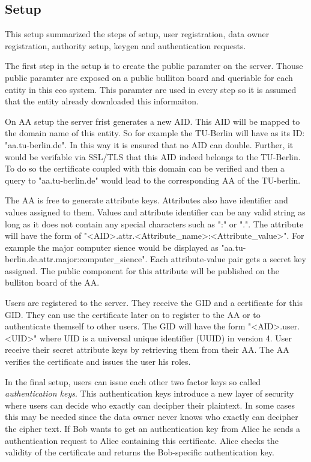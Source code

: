 \subsection{Setup}
This setup summarized the steps of \cite{li2017two} setup, user registration, data owner registration, authority setup, keygen and authentication requests. 

The first step in the setup is to create the public paramter on the server. Thouse public paramter are exposed on a public bulliton board and queriable for each entity in this eco system. This paramter are used in every step so it is assumed that the entity already downloaded this informaiton. 

On AA setup the server frist generates a new AID. This AID will be mapped to the domain name of this entity. So for example the TU-Berlin will have as its ID: "aa.tu-berlin.de". In this way it is ensured that no AID can double. Further, it would be verifable via SSL/TLS that this AID indeed belongs to the TU-Berlin. To do so the certificate coupled with this domain can be verified and then a query to "aa.tu-berlin.de" would lead to the corresponding AA of the TU-berlin.

The AA is free to generate attribute keys. Attributes also have identifier and values assigned to them. Values and attribute identifier can be any valid string as long as it does not contain any special characters such as ":" or ".". The attribute will have the form of "<AID>.attr.<Attribute_name>:<Attribute_value>". For example the major computer sience would be displayed as "aa.tu-berlin.de.attr.major:computer_sience". Each attribute-value pair gets a secret key assigned. The public component for this attribute will be published on the bulliton board of the AA. 

Users are registered to the server. They receive the GID and a certificate for this GID. They can use the certificate later on to register to the AA or to authenticate themself to other users. The GID will have the form "<AID>.user.<UID>" where UID is a universal unique identifier (\ac{UUID}) in version 4.  
User receive their secret attribute keys by retrieving them from their AA. The AA verifies the certificate and issues the user his roles.

In the final setup, users can issue each other two factor keys so called \textit{authentication keys}. This authentication keys introduce a new layer of security where users can decide who exactly can decipher their plaintext. In some cases this may be needed since the data owner never knows who exactly can decipher the cipher text. 
If Bob wants to get an authentication key from Alice he sends a authentication request to Alice containing this certificate. Alice checks the validity of the certificate and returns the Bob-specific authentication key.  

